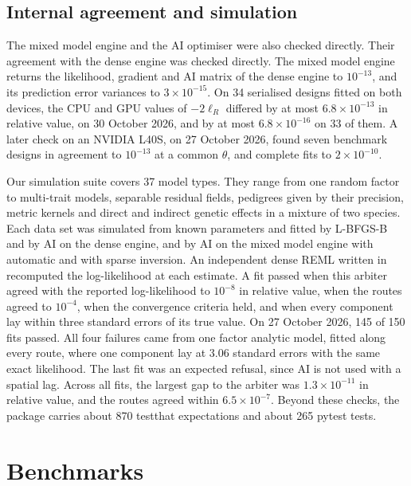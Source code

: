 \documentclass[article,nojss]{jss}
\renewcommand{\pkg}[1]{#1}
\begin{document}
\subsection{Internal agreement and simulation}

The mixed model engine and the AI optimiser were also checked directly. Their agreement with the dense engine was checked directly. The mixed model
engine returns the likelihood, gradient and AI matrix of the dense engine to
$10^{-13}$, and its prediction error variances to $3 \times 10^{-15}$. On
34 serialised designs fitted on both devices, the CPU and GPU values of
$-2\ell_R$ differed by at most $6.8 \times 10^{-13}$ in relative value, on
30 October 2026, and by at most $6.8 \times 10^{-16}$ on 33 of them. A later check on an NVIDIA L40S, on 27 October 2026, found
seven benchmark designs in agreement to $10^{-13}$ at a common $\theta$, and
complete fits to $2 \times 10^{-10}$.

Our simulation suite covers 37 model types. They range from one random factor
to multi-trait  models, separable residual fields, pedigrees given by
their precision, metric kernels and direct and indirect genetic effects in a
mixture of two species. Each data set was simulated from known parameters and
fitted by L-BFGS-B and by AI on the dense engine, and by AI on the mixed model
engine with automatic and with sparse inversion. An
independent dense REML written in  recomputed the log-likelihood at each estimate. A
fit passed when this arbiter agreed with the reported log-likelihood to
$10^{-8}$ in relative value, when the routes agreed to $10^{-4}$, when the
convergence criteria held, and when every component lay within three standard
errors of its true value. On 27 October 2026, 145 of 150 fits passed. All
four failures came from one factor analytic model, fitted along every route,
where one component lay at 3.06 standard errors with the same exact
likelihood. The last fit was an expected refusal, since AI is not used with a
spatial lag. Across all fits, the largest gap to the arbiter was $1.3 \times
10^{-11}$ in relative value, and the routes agreed within $6.5 \times
10^{-7}$. Beyond these checks, the package carries about 870 \pkg{testthat}
expectations and about 265 \pkg{pytest} tests.

\section{Benchmarks}\label{sec:benchmarks}
\end{document}
